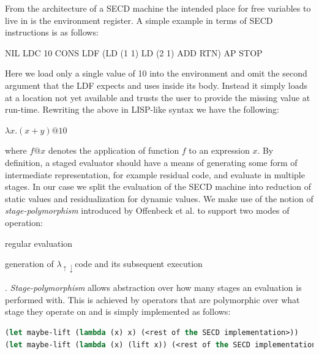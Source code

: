 \documentclass[fleqn]{article}
\theoremstyle{definition}
\newcommand{\mslang}{$\lambda_{\uparrow\downarrow}$}
\begin{document}
From the architecture of a SECD machine the intended place for free variables to live in is the environment register. A simple example in terms of SECD instructions is as follows:

NIL LDC 10 CONS LDF (LD (1 1) LD (2 1) ADD RTN) AP STOP

Here we load only a single value of 10 into the environment and omit the second argument that the LDF expects and uses inside its body. Instead it simply loads at a location not yet available and trusts the user to provide the missing value at run-time. Rewriting the above in LISP-like syntax we have the following:

$\lambda x.(x + y)@10$

where $f@x$ denotes the application of function $f$ to an expression $x$. By definition, a staged evaluator should have a means of generating some form of intermediate representation, for example residual code, and evaluate in multiple stages. In our case we split the evaluation of the SECD machine into reduction of static values and residualization for dynamic values. We make use of the notion of \textit{stage-polymorphism} introduced by Offenbeck et al. \cite{ofenbeck2017staging} to support two modes of operation:
\begin{enumerate*}[label=(\arabic*)]
	\item regular evaluation
	\item generation of \mslang code and its subsequent execution
\end{enumerate*}.
\textit{Stage-polymorphism} allows abstraction over how many stages an evaluation is performed with. This is achieved by operators that are polymorphic over what stage they operate on and is simply implemented as follows:

\begin{lstlisting}[language=Lisp]
(let maybe-lift (lambda (x) x) (<rest of the SECD implementation>))
(let maybe-lift (lambda (x) (lift x)) (<rest of the SECD implementation>))
\end{lstlisting}
\end{document}

